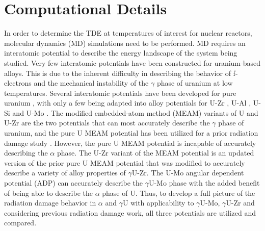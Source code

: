 \documentclass[review]{elsarticle}
\begin{document}
\section{Computational Details}
In order to determine the TDE at temperatures of interest for nuclear reactors, molecular dynamics (MD) \cite{abraham1986, allen1987} simulations need to be performed. MD requires an interatomic potential to describe the energy landscape of the system being studied. Very few interatomic potentials have been constructed for uranium-based alloys. This is due to the inherent difficulty in describing the behavior of f-electrons and the mechanical instability of the $\gamma$ phase of uranium at low temperatures. Several interatomic potentials have been developed for pure uranium \cite{beeler_meam, beelerASTM, fernandez2014, li2011, smirnova2012, li2012}, with only a few being adapted into alloy potentials for U-Zr \cite{moore2015}, U-Al \cite{pascuet2012}, U-Si \cite{beelerUSi} and U-Mo \cite{smirnovaUMo}. The modified embedded-atom method (MEAM) variants of U and U-Zr \cite{beeler_meam, moore2015} are the two potentials that can most accurately describe the $\gamma$ phase of uranium, and the pure U MEAM potential \cite{beeler_meam} has been utilized for a prior radiation damage study \cite{miao2015}. However, the pure U MEAM potential is incapable of accurately describing the $\alpha$ phase. The U-Zr variant of the MEAM potential is an updated version of the prior pure U MEAM potential that was modified to accurately describe a variety of alloy properties of $\gamma$U-Zr. The U-Mo angular dependent potential (ADP) \cite{smirnovaADP} can accurately describe the $\gamma$U-Mo phase with the added benefit of being able to describe the $\alpha$ phase of U. Thus, to develop a full picture of the radiation damage behavior in $\alpha$ and $\gamma$U with applicability to $\gamma$U-Mo, $\gamma$U-Zr and considering previous radiation damage work, all three potentials are utilized and compared.
\end{document}
